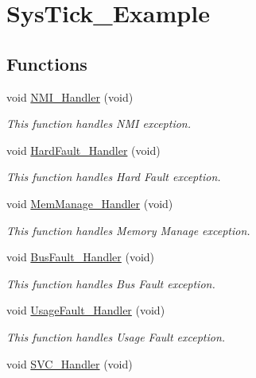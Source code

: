 \hypertarget{group___sys_tick___example}{\section{Sys\-Tick\-\_\-\-Example}
\label{group___sys_tick___example}
}
\subsection*{Functions}
\begin{DoxyCompactItemize}
\item 
void \hyperlink{group___sys_tick___example_ga6ad7a5e3ee69cb6db6a6b9111ba898bc}{N\-M\-I\-\_\-\-Handler} (void)
\begin{DoxyCompactList}\small\item\em This function handles N\-M\-I exception. \end{DoxyCompactList}\item 
void \hyperlink{group___sys_tick___example_ga2bffc10d5bd4106753b7c30e86903bea}{Hard\-Fault\-\_\-\-Handler} (void)
\begin{DoxyCompactList}\small\item\em This function handles Hard Fault exception. \end{DoxyCompactList}\item 
void \hyperlink{group___sys_tick___example_ga3150f74512510287a942624aa9b44cc5}{Mem\-Manage\-\_\-\-Handler} (void)
\begin{DoxyCompactList}\small\item\em This function handles Memory Manage exception. \end{DoxyCompactList}\item 
void \hyperlink{group___sys_tick___example_ga850cefb17a977292ae5eb4cafa9976c3}{Bus\-Fault\-\_\-\-Handler} (void)
\begin{DoxyCompactList}\small\item\em This function handles Bus Fault exception. \end{DoxyCompactList}\item 
void \hyperlink{group___sys_tick___example_ga1d98923de2ed6b7309b66f9ba2971647}{Usage\-Fault\-\_\-\-Handler} (void)
\begin{DoxyCompactList}\small\item\em This function handles Usage Fault exception. \end{DoxyCompactList}\item 
void \hyperlink{group___sys_tick___example_ga3e5ddb3df0d62f2dc357e64a3f04a6ce}{S\-V\-C\-\_\-\-Handler} (void)

\end{DoxyCompactItemize}
